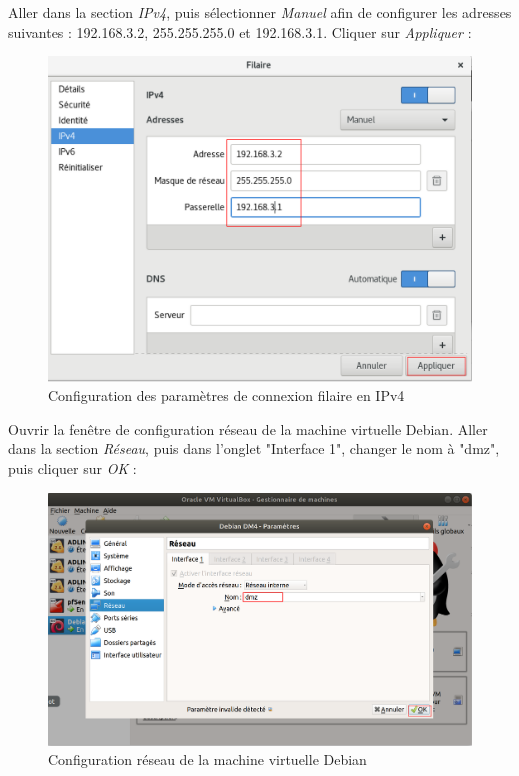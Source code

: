 Aller dans la section \textit{IPv4}, puis sélectionner \textit{Manuel} afin de configurer les adresses suivantes : 192.168.3.2, 255.255.255.0 et 192.168.3.1. Cliquer sur \textit{Appliquer} :
  \begin{figure}[h!]
     \begin{center}
         \includegraphics[scale=0.6]{Debian_screenshots/Config/17.png}
         \caption{Configuration des paramètres de connexion filaire en IPv4}
         \label{Debian_screenshots/Config/17}
     \end{center}
  \end{figure}
  \FloatBarrier

\pagebreak
Ouvrir la fenêtre de configuration réseau de la machine virtuelle Debian. Aller dans la section \textit{Réseau}, puis dans l'onglet "Interface 1", changer le nom à "dmz", puis cliquer sur \textit{OK} :
  \begin{figure}[h!]
     \begin{center}
         \includegraphics[scale=0.5]{Debian_screenshots/Config/18.png}
         \caption{Configuration réseau de la machine virtuelle Debian}
         \label{Debian_screenshots/Config/18}
     \end{center}
  \end{figure}
  \FloatBarrier
     

